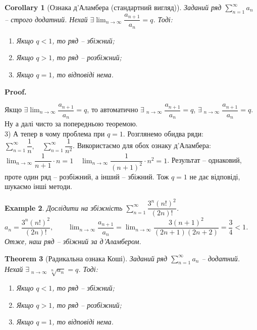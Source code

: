 \documentclass[a4paper, 10pt]{article}
\makeatletter
\DeclareMathOperator*\uplim{\overline{lim}}
\DeclareMathOperator*\downlim{\underline{lim}}
\def\huge{\displaystyle}
\theoremstyle{theoremdd}
\newtheorem{theorem}{Theorem}[subsection]
\theoremstyle{theoremdd}
\theoremstyle{theoremdd}
\theoremstyle{theoremdd}
\theoremstyle{theoremdd}
\newtheorem{example}[theorem]{Example}
\theoremstyle{theoremdd}
\theoremstyle{theoremdd}
\theoremstyle{theoremdd}
\theoremstyle{theoremdd}
\newtheorem{corollary}[theorem]{Corollary}
\renewenvironment{proof}[1][Proof.\\]{\par
\pushQED{\hfill \qed}%
\normalfont \topsep6\p@\@plus6\p@\relax
\trivlist
\item\relax
{\bfseries
#1\@addpunct{.}}\hspace\labelsep\ignorespaces
}{%
\popQED\endtrivlist\@endpefalse
}
\makeatother
\begin{document}
\begin{corollary}[Ознака д'Аламбера (стандартний вигляд)]
Заданий ряд $\huge \sum_{n=1}^{\infty} a_n$ -- строго додатний. Нехай $\exists \huge \lim_{n \to \infty} \dfrac{a_{n+1}}{a_n} = q$. Тоді:
\begin{enumerate}[nosep,wide=0pt,label={\arabic*)}]
\item Якщо $q<1$, то ряд -- збіжний;
\item Якщо $q>1$, то ряд -- розбіжний;
\item Якщо $q=1$, то відповіді нема.
\end{enumerate}
\end{corollary}

\begin{proof}
Якщо $\exists \huge\lim_{n \to \infty} \dfrac{a_{n+1}}{a_n} = q$, то автоматично $\exists \huge\uplim_{n \to \infty} \dfrac{a_{n+1}}{a_n} = q$, $\exists \huge\downlim_{n \to \infty} \dfrac{a_{n+1}}{a_n} = q$. Ну а далі чисто за попередньою теоремою.
\bigskip \\
3) А тепер в чому проблема при $q = 1$. Розглянемо обидва ряди: $\huge \sum_{n=1}^\infty \dfrac{1}{n}, \quad \sum_{n=1}^\infty \dfrac{1}{n^2}$.
Використаємо для обох ознаку д'Аламбера: $\huge \lim_{n \to \infty} \dfrac{1}{n+1} \cdot n = 1 \quad \lim_{n \to \infty} \dfrac{1}{(n+1)^2} \cdot n^2 = 1$. Результат -- однаковий, проте один ряд -- розбіжний, а інший -- збіжний. Тож $q = 1$ не дає відповіді, шукаємо інші методи.
\end{proof}

\begin{example}
Дослідити на збіжність $\huge\sum_{n=1}^\infty \dfrac{3^n (n!)^2}{(2n)!}$.\\
$a_n = \dfrac{3^n (n!)^2}{(2n)!}, \qquad \huge\lim_{n \to \infty} \dfrac{a_{n+1}}{a_n} = \lim_{n \to \infty} \dfrac{3 (n+1)^2}{(2n+1)(2n+2)} = \dfrac{3}{4} < 1$.\\
Отже, наш ряд -- збіжний за д'Аламбером.
\end{example}

\begin{theorem}[Радикальна ознака Коші]
Заданий ряд $\huge \sum_{n=1}^{\infty} a_n$ -- додатний. Нехай $\exists \huge \uplim_{n \to \infty} \sqrt[n]{a_n} = q$. Тоді:
\begin{enumerate}[nosep,wide=0pt,label={\arabic*)}]
\item Якщо $q<1$, то ряд -- збіжний;
\item Якщо $q>1$, то ряд -- розбіжний;
\item Якщо $q=1$, то відповіді нема.
\end{enumerate}
\end{theorem}
\end{document}

